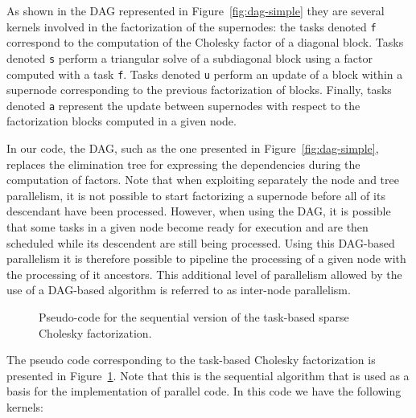 \documentclass{article}
\begin{document}
As shown in the DAG represented in Figure~\ref{fig:dag-simple} they
are several kernels involved in the factorization of the supernodes:
the tasks denoted \texttt{f} correspond to the computation of the
Cholesky factor of a diagonal block. Tasks denoted \texttt{s} perform
a triangular solve of a subdiagonal block using a factor computed with
a task \texttt{f}. Tasks denoted \texttt{u} perform an update of a
block within a supernode corresponding to the previous factorization
of blocks. Finally, tasks denoted \texttt{a} represent the update
between supernodes with respect to the factorization blocks computed
in a given node.

In our code, the DAG, such as the one presented in
Figure~\ref{fig:dag-simple}, replaces the elimination tree for
expressing the dependencies during the computation of factors. Note
that when exploiting separately the node and tree parallelism, it is
not possible to start factorizing a supernode before all of its
descendant have been processed. However, when using the DAG, it is
possible that some tasks in a given node become ready for execution
and are then scheduled while its descendent are still being
processed. Using this DAG-based parallelism it is therefore possible
to pipeline the processing of a given node with the processing of it
ancestors. This additional level of parallelism allowed by the use of
a DAG-based algorithm is referred to as inter-node parallelism.

\begin{figure}[!h]
  \centering 
\caption{\label{fig:spllt-facto-seq-pseudocode}Pseudo-code for the
  sequential version of the task-based sparse Cholesky factorization.}
\end{figure}

The pseudo code corresponding to the task-based Cholesky factorization
is presented in Figure~\ref{fig:spllt-facto-seq-pseudocode}. Note that
this is the sequential algorithm that is used as a basis for the
implementation of parallel code. In this code we have the following
kernels:
\end{document}
